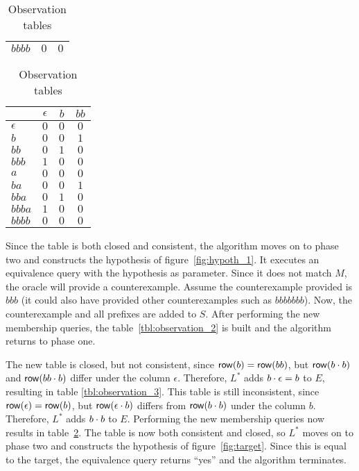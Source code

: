 \begin{table}[b]
\begin{subtable}[h]{.23\textwidth}
\begin{tabular}{ | l || c | c | }
$bbbb$     & $0$        & $0$ \\
\hline
\end{tabular}
\caption{} \label{tbl:observation_3}
\end{subtable}
%
%
\hfill
\begin{subtable}[h]{.23\textwidth}
\centering
\begin{tabular}{ | l || c | c | c | }
\hline
           & $\epsilon$ & $b$   & $bb$ \\ \hline \hline
$\epsilon$ & $0$        & $0$   & $0$  \\
$b$        & $0$        & $0$   & $1$  \\
$bb$       & $0$        & $1$   & $0$  \\
$bbb$      & $1$        & $0$   & $0$  \\ \hline \hline
$a$        & $0$        & $0$   & $0$  \\
$ba$       & $0$        & $0$   & $1$  \\
$bba$      & $0$        & $1$   & $0$  \\
$bbba$     & $1$        & $0$   & $0$  \\
$bbbb$     & $0$        & $0$   & $0$  \\
\hline
\end{tabular}
\caption{} \label{tbl:observation_4}
\end{subtable}
\caption{Observation tables}
\end{table}

Since the table is both closed and consistent, the algorithm moves on to phase two
and constructs the hypothesis of figure~\ref{fig:hypoth_1}. It executes an
equivalence query with the hypothesis as parameter. Since it does not match $M$,
the oracle will provide a counterexample. Assume the counterexample provided is
$bbb$ (it could also have provided other counterexamples such as $bbbbbbb$).
Now, the counterexample and all prefixes are added to $S$. After performing the
new membership queries, the table~\ref{tbl:observation_2} is built and the
algorithm returns to phase one.

The new table is closed, but not consistent, since $\mathsf{row}(b) = \mathsf{row}(bb)$, but
$\mathsf{row}(b \cdot b)$ and $\mathsf{row}(bb \cdot b)$ differ under the column $\epsilon$.
Therefore, $L^*$ adds $b \cdot \epsilon = b$ to $E$, resulting in table
\ref{tbl:observation_3}. This table is still inconsistent, since $\mathsf{row}(\epsilon)
= \mathsf{row}(b)$, but $\mathsf{row}(\epsilon \cdot b)$ differs from $\mathsf{row}(b \cdot b)$ under
the column $b$. Therefore, $L^*$ adds $b \cdot b$ to $E$. Performing the new
membership queries now results in table~\ref{tbl:observation_4}. The table is
now both consistent and closed, so $L^*$ moves on to phase two and constructs the
hypothesis of figure~\ref{fig:target}. Since this is equal to the target, the
equivalence query returns ``yes'' and the algorithm terminates.

